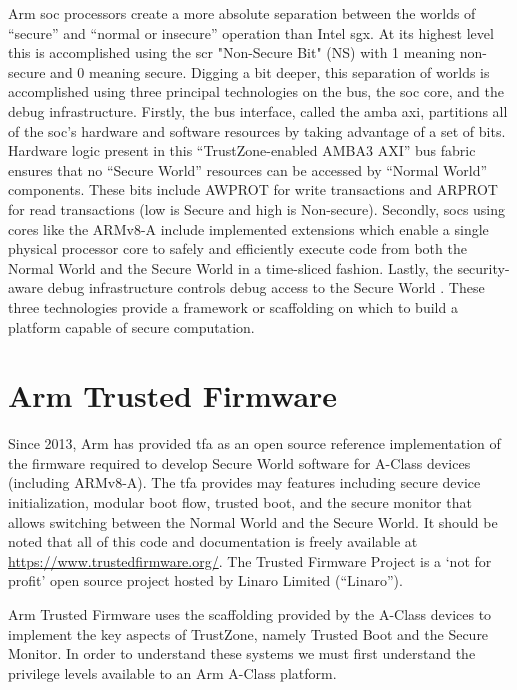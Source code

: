 Arm \gls{soc} processors create a more absolute separation between the worlds of ``secure'' and ``normal or insecure'' operation than Intel \gls{sgx}. At its highest level this is accomplished using the \gls{scr} "Non-Secure Bit" (NS) with 1 meaning non-secure and 0 meaning secure. Digging a bit deeper, this separation of worlds is accomplished using three principal technologies on the bus, the \gls{soc} core, and the debug infrastructure. Firstly, the bus interface, called the \gls{amba} \gls{axi}, partitions all of the \gls{soc}’s hardware and software resources by taking advantage of a set of bits. Hardware logic present in this ``TrustZone-enabled AMBA3 AXI'' bus fabric ensures that no ``Secure World'' resources can be accessed by ``Normal World'' components. These bits include AWPROT for write transactions and ARPROT for read transactions (low is Secure and high is Non-secure). Secondly, \gls{soc}s using cores like the ARMv8-A include implemented extensions which enable a single physical processor core to safely and efficiently execute code from both the Normal World and the Secure World in a time-sliced fashion. Lastly, the security-aware debug infrastructure controls debug access to the Secure World \cite{ArmWhitepaper}. These three technologies provide a framework or scaffolding on which to build a platform capable of secure computation.

\section{Arm Trusted Firmware}
Since 2013, Arm has provided \gls{tfa} as an open source reference implementation of the firmware required to develop Secure World software for A-Class devices (including ARMv8-A). The \gls{tfa} provides may features including secure device initialization, modular boot flow, trusted boot, and the secure monitor that allows switching between the Normal World and the Secure World. It should be noted that all of this code and documentation is freely available at \url{https://www.trustedfirmware.org/}. The Trusted Firmware Project is a `not for profit' open source project hosted by Linaro Limited (``Linaro'').

Arm Trusted Firmware uses the scaffolding provided by the A-Class devices to implement the key aspects of TrustZone, namely Trusted Boot and the Secure Monitor. In order to understand these systems we must first understand the privilege levels available to an Arm A-Class platform.

\renewcommand{\arraystretch}{2.5}



